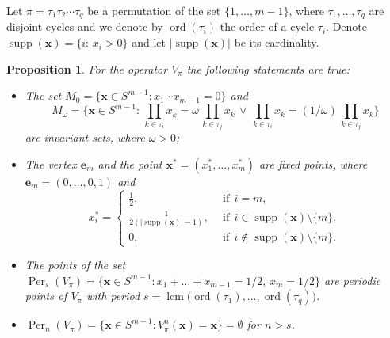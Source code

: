 \documentclass[11pt,reqno]{amsart}
\newtheorem{proposition}[subsection]{Proposition}
\numberwithin{equation}{section} \setcounter{tocdepth}{1}
\DeclareMathOperator{\lcm}{lcm}
\DeclareMathOperator{\supp}{supp}
\DeclareMathOperator{\ord}{ord}
\DeclareMathOperator{\Per}{Per}
\begin{document}
Let $\pi=\tau_1\tau_2\cdots\tau_q$ be a permutation of the set $\{1,\dots,m-1\}$, where $\tau_1,\dots,\tau_q$ are disjoint cycles and
we denote by $\ord (\tau_i)$ the order of a cycle $\tau_i$.
Denote $\supp (\mathbf{x})=\{i: \, x_i>0\}$ and let $|\supp (\mathbf{x})|$ be its cardinality.
\begin{proposition}
For the operator $V_\pi$ the following statements are true:
\begin{itemize}
\item[i)] The  set $M_{0}=\{\mathbf{x}\in S^{m-1}: x_{1}\cdots x_{m-1}=0\}$  and
 \[M_{\omega}=\Big\{\mathbf{x}\in S^{m-1}: \, \prod_{k\in \tau_i} x_{k}= \omega \, \prod_{k\in \tau_j} x_k \,
 \vee \, \prod_{k\in \tau_i} x_{k} = (1/\omega) \, \prod_{k\in \tau_j} x_k  \Big\}\]
are invariant sets, where $ \omega>0$;
\item[ii)] The vertex $\mathbf{e}_m$ and the point $\mathbf{x}^*=(x_1^*,\dots,x_m^*)$ are fixed points, where $\mathbf{e}_m=(0,\dots,0,1)$ and
\[ x^*_i =\begin{cases}
\frac{1}{ 2},& \ \ \text{if} \ \ i=m,\\
\frac{1}{ 2(|\supp (\mathbf{x})|-1)},& \ \ \text{if} \ \ i\in \supp (\mathbf{x})\setminus \{m\},\\
0, & \ \ \text{if} \ \ i\notin \supp (\mathbf{x})\setminus \{m\}.
\end{cases}\]
\item[iii)] The points of the set $\Per_s(V_\pi) =\{\mathbf{x}\in S^{m-1} : x_1+\dots+x_{m-1}=1/2, \, x_m=1/2\}$ are
periodic points of $V_\pi$ with period $s=\lcm \big(\ord (\tau_1),\dots, \ord (\tau_q)\big)$.
\item[iv)] $ \Per_n(V_\pi) =\{\mathbf{x}\in S^{m-1} : V_\pi^n(\mathbf{x})=\mathbf{x} \}=\emptyset$ for $n>s$.
\end{itemize}
\end{proposition}
\end{document}
